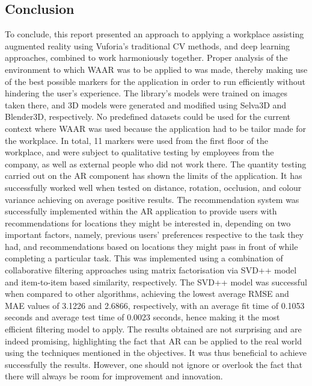 \documentclass{aifyp}
\begin{document}

\subsection{Conclusion}
\indent To conclude, this report presented an approach to applying a workplace assisting augmented reality using Vuforia’s traditional CV methods, and deep learning approaches, combined to work harmoniously together. Proper analysis of the environment to which WAAR was to be applied to was made, thereby making use of the best possible markers for the application in order to run efficiently without hindering the user’s experience. The library’s models were trained on images taken there, and 3D models were generated and modified using Selva3D and Blender3D, respectively. No predefined datasets could be used for the current context where WAAR was used because the application had to be tailor made for the workplace. In total, 11 markers were used from the first floor of the workplace, and were subject to qualitative testing by employees from the company, as well as external people who did not work there. The quantity testing carried out on the AR component has shown the limits of the application. It has successfully worked well when tested on distance, rotation, occlusion, and colour variance achieving on average positive results.
\newline
\newline
\indent The recommendation system was successfully implemented within the AR application to provide users with recommendations for locations they might be interested in, depending on two important factors, namely, previous users’ preferences respective to the task they had, and recommendations based on locations they might pass in front of while completing a particular task. This was implemented using a combination of collaborative filtering approaches using matrix factorisation via SVD++ model and item-to-item based similarity, respectively. The SVD++ model was successful when compared to other algorithms, achieving the lowest average RMSE and MAE values of 3.1226 and 2.6866, respectively, with an average fit time of 0.1053 seconds and average test time of 0.0023 seconds, hence making it the most efficient filtering model to apply. The results obtained are not surprising and are indeed promising, highlighting the fact that AR can be applied to the real world using the techniques mentioned in the objectives. It was thus beneficial to achieve successfully the results. However, one should not ignore or overlook the fact that there will always be room for improvement and innovation. 
\end{document}
